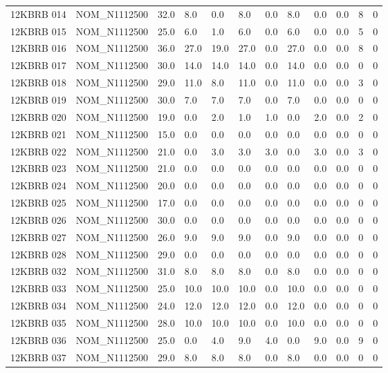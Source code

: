 \begin{table}[htbp]
\begin{tabular}{llllllllllll}
12KBRB 014 & NOM\_N1112500 & 32.0 & 8.0 & 0.0 & 8.0 & 0.0 & 8.0 & 0.0 & 0.0 & 8 & 0 \\
12KBRB 015 & NOM\_N1112500 & 25.0 & 6.0 & 1.0 & 6.0 & 0.0 & 6.0 & 0.0 & 0.0 & 5 & 0 \\
12KBRB 016 & NOM\_N1112500 & 36.0 & 27.0 & 19.0 & 27.0 & 0.0 & 27.0 & 0.0 & 0.0 & 8 & 0 \\
12KBRB 017 & NOM\_N1112500 & 30.0 & 14.0 & 14.0 & 14.0 & 0.0 & 14.0 & 0.0 & 0.0 & 0 & 0 \\
12KBRB 018 & NOM\_N1112500 & 29.0 & 11.0 & 8.0 & 11.0 & 0.0 & 11.0 & 0.0 & 0.0 & 3 & 0 \\
12KBRB 019 & NOM\_N1112500 & 30.0 & 7.0 & 7.0 & 7.0 & 0.0 & 7.0 & 0.0 & 0.0 & 0 & 0 \\
12KBRB 020 & NOM\_N1112500 & 19.0 & 0.0 & 2.0 & 1.0 & 1.0 & 0.0 & 2.0 & 0.0 & 2 & 0 \\
12KBRB 021 & NOM\_N1112500 & 15.0 & 0.0 & 0.0 & 0.0 & 0.0 & 0.0 & 0.0 & 0.0 & 0 & 0 \\
12KBRB 022 & NOM\_N1112500 & 21.0 & 0.0 & 3.0 & 3.0 & 3.0 & 0.0 & 3.0 & 0.0 & 3 & 0 \\
12KBRB 023 & NOM\_N1112500 & 21.0 & 0.0 & 0.0 & 0.0 & 0.0 & 0.0 & 0.0 & 0.0 & 0 & 0 \\
12KBRB 024 & NOM\_N1112500 & 20.0 & 0.0 & 0.0 & 0.0 & 0.0 & 0.0 & 0.0 & 0.0 & 0 & 0 \\
12KBRB 025 & NOM\_N1112500 & 17.0 & 0.0 & 0.0 & 0.0 & 0.0 & 0.0 & 0.0 & 0.0 & 0 & 0 \\
12KBRB 026 & NOM\_N1112500 & 30.0 & 0.0 & 0.0 & 0.0 & 0.0 & 0.0 & 0.0 & 0.0 & 0 & 0 \\
12KBRB 027 & NOM\_N1112500 & 26.0 & 9.0 & 9.0 & 9.0 & 0.0 & 9.0 & 0.0 & 0.0 & 0 & 0 \\
12KBRB 028 & NOM\_N1112500 & 29.0 & 0.0 & 0.0 & 0.0 & 0.0 & 0.0 & 0.0 & 0.0 & 0 & 0 \\
12KBRB 032 & NOM\_N1112500 & 31.0 & 8.0 & 8.0 & 8.0 & 0.0 & 8.0 & 0.0 & 0.0 & 0 & 0 \\
12KBRB 033 & NOM\_N1112500 & 25.0 & 10.0 & 10.0 & 10.0 & 0.0 & 10.0 & 0.0 & 0.0 & 0 & 0 \\
12KBRB 034 & NOM\_N1112500 & 24.0 & 12.0 & 12.0 & 12.0 & 0.0 & 12.0 & 0.0 & 0.0 & 0 & 0 \\
12KBRB 035 & NOM\_N1112500 & 28.0 & 10.0 & 10.0 & 10.0 & 0.0 & 10.0 & 0.0 & 0.0 & 0 & 0 \\
12KBRB 036 & NOM\_N1112500 & 25.0 & 0.0 & 4.0 & 9.0 & 4.0 & 0.0 & 9.0 & 0.0 & 9 & 0 \\
12KBRB 037 & NOM\_N1112500 & 29.0 & 8.0 & 8.0 & 8.0 & 0.0 & 8.0 & 0.0 & 0.0 & 0 & 0 \\

\end{tabular}
\end{table}
